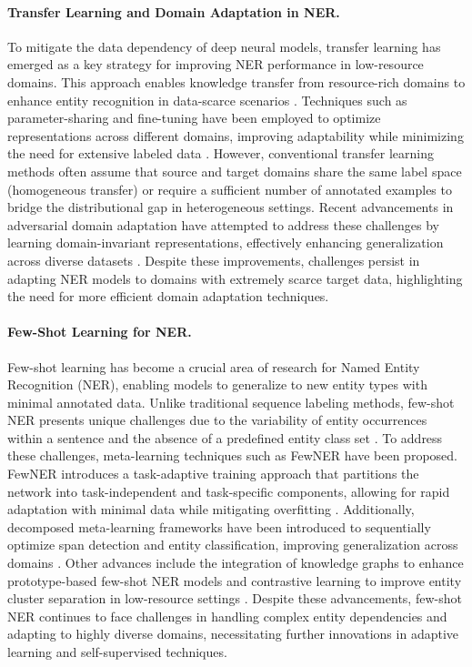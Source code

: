 \paragraph{Transfer Learning and Domain Adaptation in NER.}  
To mitigate the data dependency of deep neural models, transfer learning has emerged as a key strategy for improving NER performance in low-resource domains. This approach enables knowledge transfer from resource-rich domains to enhance entity recognition in data-scarce scenarios \cite{Shah2021Multi-Task}. Techniques such as parameter-sharing and fine-tuning have been employed to optimize representations across different domains, improving adaptability while minimizing the need for extensive labeled data \cite{Widyawan2024A}. However, conventional transfer learning methods often assume that source and target domains share the same label space (homogeneous transfer) or require a sufficient number of annotated examples to bridge the distributional gap in heterogeneous settings. Recent advancements in adversarial domain adaptation have attempted to address these challenges by learning domain-invariant representations, effectively enhancing generalization across diverse datasets \cite{Zhu2024Chinese}. Despite these improvements, challenges persist in adapting NER models to domains with extremely scarce target data, highlighting the need for more efficient domain adaptation techniques.

\paragraph{Few-Shot Learning for NER.}  
Few-shot learning has become a crucial area of research for Named Entity Recognition (NER), enabling models to generalize to new entity types with minimal annotated data. Unlike traditional sequence labeling methods, few-shot NER presents unique challenges due to the variability of entity occurrences within a sentence and the absence of a predefined entity class set \cite{DeLichy2021Meta-Learning}.
To address these challenges, meta-learning techniques such as FewNER have been proposed. FewNER introduces a task-adaptive training approach that partitions the network into task-independent and task-specific components, allowing for rapid adaptation with minimal data while mitigating overfitting \cite{Li2023Few-Shot}. Additionally, decomposed meta-learning frameworks have been introduced to sequentially optimize span detection and entity classification, improving generalization across domains \cite{2022Decomposed}. Other advances include the integration of knowledge graphs to enhance prototype-based few-shot NER models \cite{Zhang2024KCL} and contrastive learning to improve entity cluster separation in low-resource settings \cite{Huang2022COPNER}. Despite these advancements, few-shot NER continues to face challenges in handling complex entity dependencies and adapting to highly diverse domains, necessitating further innovations in adaptive learning and self-supervised techniques.

